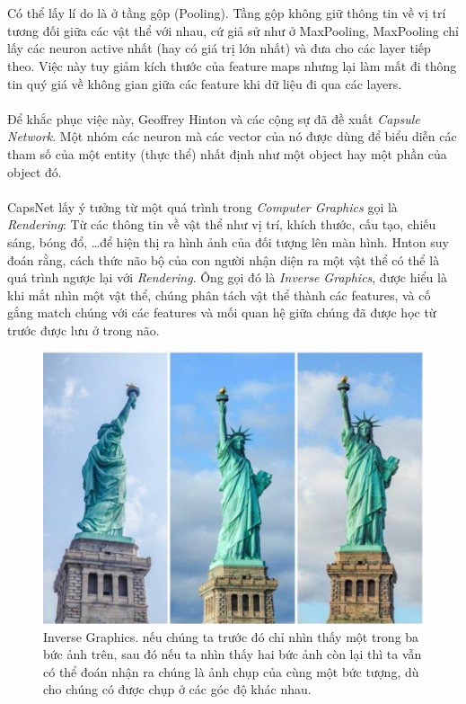 \documentclass{article}
\begin{document}
\phantom{a}\\\\
Có thể lấy lí do là ở tầng gộp (Pooling). Tầng gộp không giữ thông tin về vị trí tương đối giữa các vật thể với nhau, cứ giả sử như ở MaxPooling, MaxPooling chỉ lấy các neuron active nhất (hay có giá trị lớn nhất) và đưa cho các layer tiếp theo. Việc này tuy giảm kích thước của feature maps nhưng lại làm mất đi thông tin quý giá về không gian giữa các feature khi dữ liệu đi qua các layers.\\\\
Để khắc phục việc này, Geoffrey Hinton và các cộng sự đã đề xuất \textit{Capsule Network}. Một nhóm các neuron mà các vector của nó được dùng để biểu diễn các tham số của một entity (thực thể) nhất định như một object hay một phần của object đó.\\\\
CapsNet lấy ý tưởng từ một quá trình trong \textit{Computer Graphics} gọi là \textit{Rendering}: Từ các thông tin về vật thể như vị trí, khích thước, cấu tạo, chiếu sáng, bóng đổ, \ldots để hiện thị ra hình ảnh của đối tượng lên màn hình. Hnton suy đoán rằng, cách thức não bộ của con người nhận diện ra một vật thể có thể là quá trình ngược lại với \textit{Rendering}. Ông gọi đó là \textit{Inverse Graphics}, được hiểu là khi mắt nhìn một vật thể, chúng phân tách vật thể thành các features, và cố gắng match chúng với các features và mối quan hệ giữa chúng đã được học từ trước được lưu ở trong não.
\begin{figure}
    \centering
    \includegraphics[width = 0.6\linewidth]{download (3).jpg}
    \caption{Inverse Graphics. nếu chúng ta trước đó chỉ nhìn thấy một trong ba bức ảnh trên, sau đó nếu ta nhìn thấy hai bức ảnh còn lại thì ta vẫn có thể đoán nhận ra chúng là ảnh chụp của cùng một bức tượng, dù cho chúng có được chụp ở các góc độ khác nhau.}
    \label{fig24}
\end{figure}
\end{document}
